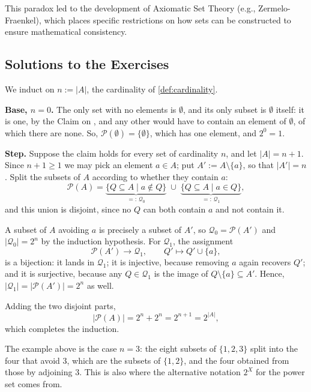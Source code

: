 This paradox led to the development of Axiomatic Set Theory (e.g., Zermelo-Fraenkel), which places specific restrictions on how sets can be constructed to ensure mathematical consistency.

\subsection{Solutions to the Exercises}
\label{sec:solutions_set_theory}

\begin{exercisesolution}
\label{sol:power_set_cardinality}
We induct on $n := |A|$, the cardinality of \cref{def:cardinality}.

\textbf{Base, $n = 0$.} The only set with no elements is $\emptyset$, and its only subset is $\emptyset$ itself: it is one, by the Claim on , and any other would have to contain an element of $\emptyset$, of which there are none. So, $\mathcal{P}(\emptyset) = \{\emptyset\}$, which has one element, and $2^0 = 1$.

\textbf{Step.} Suppose the claim holds for every set of cardinality $n$, and let $|A| = n+1$. Since $n + 1 \ge 1$ we may pick an element $a \in A$; put $A' := A \setminus \{a\}$, so that $|A'| = n$. Split the subsets of $A$ according to whether they contain $a$:
\[
    \mathcal{P}(A) = \underbrace{\{Q \subseteq A \mid a \notin Q\}}_{=: \, \mathcal{Q}_0} \; \cup \; \underbrace{\{Q \subseteq A \mid a \in Q\}}_{=: \, \mathcal{Q}_1},
\]
and this union is disjoint, since no $Q$ can both contain $a$ and not contain it.

A subset of $A$ avoiding $a$ is precisely a subset of $A'$, so $\mathcal{Q}_0 = \mathcal{P}(A')$ and $|\mathcal{Q}_0| = 2^n$ by the induction hypothesis. For $\mathcal{Q}_1$, the assignment
\[
    \mathcal{P}(A') \longrightarrow \mathcal{Q}_1, \qquad Q' \longmapsto Q' \cup \{a\},
\]
is a bijection: it lands in $\mathcal{Q}_1$; it is injective, because removing $a$ again recovers $Q'$; and it is surjective, because any $Q \in \mathcal{Q}_1$ is the image of $Q \setminus \{a\} \subseteq A'$. Hence, $|\mathcal{Q}_1| = |\mathcal{P}(A')| = 2^n$ as well.

Adding the two disjoint parts,
\[
    |\mathcal{P}(A)| = 2^n + 2^n = 2^{n+1} = 2^{|A|},
\]
which completes the induction.

The example above is the case $n = 3$: the eight subsets of $\{1,2,3\}$ split into the four that avoid $3$, which are the subsets of $\{1,2\}$, and the four obtained from those by adjoining $3$. This is also where the alternative notation $2^X$ for the power set comes from.
\end{exercisesolution}

